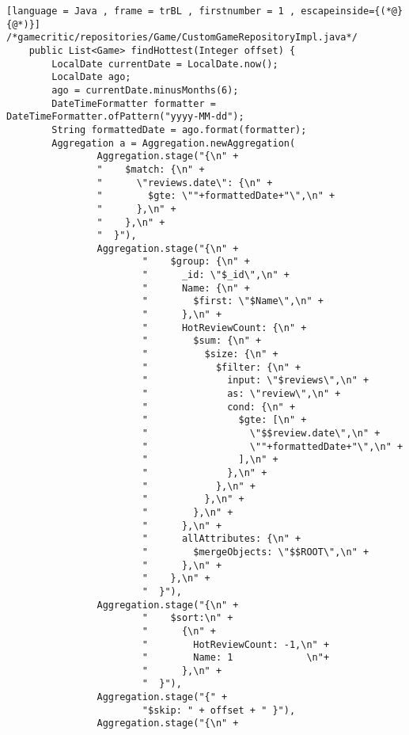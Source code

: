 \begin{lstlisting}[language = Java , frame = trBL , firstnumber = 1 , escapeinside={(*@}{@*)}]
/*gamecritic/repositories/Game/CustomGameRepositoryImpl.java*/
    public List<Game> findHottest(Integer offset) {
        LocalDate currentDate = LocalDate.now();
        LocalDate ago;
        ago = currentDate.minusMonths(6);
        DateTimeFormatter formatter = DateTimeFormatter.ofPattern("yyyy-MM-dd");
        String formattedDate = ago.format(formatter);
        Aggregation a = Aggregation.newAggregation(
                Aggregation.stage("{\n" +
                "    $match: {\n" +
                "      \"reviews.date\": {\n" +
                "        $gte: \""+formattedDate+"\",\n" +
                "      },\n" +
                "    },\n" +
                "  }"),
                Aggregation.stage("{\n" +
                        "    $group: {\n" +
                        "      _id: \"$_id\",\n" +
                        "      Name: {\n" +
                        "        $first: \"$Name\",\n" +
                        "      },\n" +
                        "      HotReviewCount: {\n" +
                        "        $sum: {\n" +
                        "          $size: {\n" +
                        "            $filter: {\n" +
                        "              input: \"$reviews\",\n" +
                        "              as: \"review\",\n" +
                        "              cond: {\n" +
                        "                $gte: [\n" +
                        "                  \"$$review.date\",\n" +
                        "                  \""+formattedDate+"\",\n" +
                        "                ],\n" +
                        "              },\n" +
                        "            },\n" +
                        "          },\n" +
                        "        },\n" +
                        "      },\n" +
                        "      allAttributes: {\n" +
                        "        $mergeObjects: \"$$ROOT\",\n" +
                        "      },\n" +
                        "    },\n" +
                        "  }"),
                Aggregation.stage("{\n" +
                        "    $sort:\n" +
                        "      {\n" +
                        "        HotReviewCount: -1,\n" +
                        "        Name: 1             \n"+
                        "      },\n" +
                        "  }"),
                Aggregation.stage("{" +
                        "$skip: " + offset + " }"),
                Aggregation.stage("{\n" +

\end{lstlisting}
